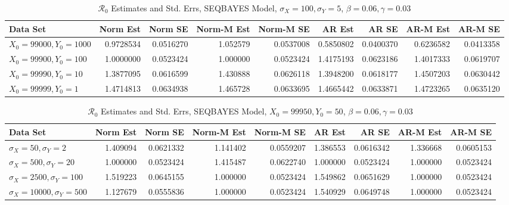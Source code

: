 \message{ !name(draft_v13.tex)}\documentclass[12pt]{article}
\newcommand{\rr}{\ensuremath{\mathcal{R}_0}}
\begin{document}
\begin{table}[H]
	
	\caption{\label{tab:}$\rr$ Estimates and Std. Errs, SEQBAYES Model,
		$\sigma_X = 100, \sigma_Y = 5$, $\beta = 0.06, \gamma = 0.03$}
	\centering
	\begin{footnotesize}
		\begin{tabular}[t]{l|r|r|r|r|r|r|r|r}
			\hline
			Data Set & Norm Est & Norm SE & Norm-M Est & Norm-M SE & AR Est & AR SE & AR-M Est & AR-M SE\\
			\hline
			$X_0 = 99000, Y_0 = 1000$ & 0.9728534 & 0.0516270 & 1.052579 & 0.0537008 & 0.5850802 & 0.0400370 & 0.6236582 & 0.0413358\\
			\hline
			$X_0 = 99900, Y_0 = 100$ & 1.0000000 & 0.0523424 & 1.000000 & 0.0523424 & 1.4175193 & 0.0623186 & 1.4017333 & 0.0619707\\
			\hline
			$X_0 = 99990, Y_0 = 10$ & 1.3877095 & 0.0616599 & 1.430888 & 0.0626118 & 1.3948200 & 0.0618177 & 1.4507203 & 0.0630442\\
			\hline
			$X_0 = 99999, Y_0 = 1$ & 1.4714813 & 0.0634938 & 1.465728 & 0.0633695 & 1.4665442 & 0.0633871 & 1.4723265 & 0.0635120\\
			\hline
		\end{tabular}
	\end{footnotesize}
\end{table}

\begin{table}[H]
	
	\caption{\label{tab:}$\rr$ Estimates and Std. Errs, SEQBAYES Model,
		$X_0 = 99950, Y_0 = 50$, $\beta = 0.06, \gamma = 0.03$}
	\centering
	\begin{footnotesize}
	\begin{tabular}[t]{l|r|r|r|r|r|r|r|r}
		\hline
		Data Set & Norm Est & Norm SE & Norm-M Est & Norm-M SE & AR Est & AR SE & AR-M Est & AR-M SE\\
		\hline
		$\sigma_X = 50, \sigma_Y = 2$ & 1.409094 & 0.0621332 & 1.141402 & 0.0559207 & 1.386553 & 0.0616342 & 1.336668 & 0.0605153\\
		\hline
		$\sigma_X = 500, \sigma_Y = 20$ & 1.000000 & 0.0523424 & 1.415487 & 0.0622740 & 1.000000 & 0.0523424 & 1.000000 & 0.0523424\\
		\hline
		$\sigma_X = 2500, \sigma_Y = 100$ & 1.519223 & 0.0645155 & 1.000000 & 0.0523424 & 1.549862 & 0.0651629 & 1.000000 & 0.0523424\\
		\hline
		$\sigma_X = 10000, \sigma_Y = 500$ & 1.127679 & 0.0555836 & 1.000000 & 0.0523424 & 1.540929 & 0.0649748 & 1.000000 & 0.0523424\\
		\hline
	\end{tabular}
\end{footnotesize}
\end{table}
\end{document}
